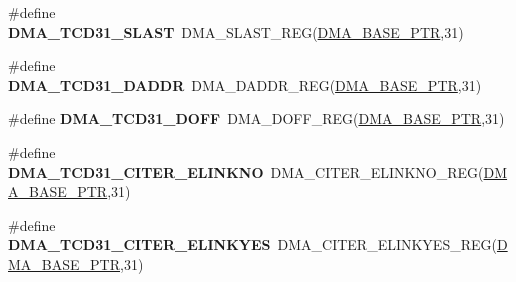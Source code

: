 \begin{DoxyCompactItemize}
\item 
\hypertarget{group___d_m_a___register___accessor___macros_gab9495f44e34200f346170d6ce6c875b5}{}\#define {\bfseries D\+M\+A\+\_\+\+T\+C\+D31\+\_\+\+S\+L\+A\+S\+T}~D\+M\+A\+\_\+\+S\+L\+A\+S\+T\+\_\+\+R\+E\+G(\hyperlink{group___d_m_a___peripheral_ga6997fbc1b1973e9f27170217a3bd6f22}{D\+M\+A\+\_\+\+B\+A\+S\+E\+\_\+\+P\+T\+R},31)\label{group___d_m_a___register___accessor___macros_gab9495f44e34200f346170d6ce6c875b5}

\item 
\hypertarget{group___d_m_a___register___accessor___macros_ga9c8a959955206d42530992dddc9a9bb7}{}\#define {\bfseries D\+M\+A\+\_\+\+T\+C\+D31\+\_\+\+D\+A\+D\+D\+R}~D\+M\+A\+\_\+\+D\+A\+D\+D\+R\+\_\+\+R\+E\+G(\hyperlink{group___d_m_a___peripheral_ga6997fbc1b1973e9f27170217a3bd6f22}{D\+M\+A\+\_\+\+B\+A\+S\+E\+\_\+\+P\+T\+R},31)\label{group___d_m_a___register___accessor___macros_ga9c8a959955206d42530992dddc9a9bb7}

\item 
\hypertarget{group___d_m_a___register___accessor___macros_ga5f305c712a4548ac254a6d0a9d2f3783}{}\#define {\bfseries D\+M\+A\+\_\+\+T\+C\+D31\+\_\+\+D\+O\+F\+F}~D\+M\+A\+\_\+\+D\+O\+F\+F\+\_\+\+R\+E\+G(\hyperlink{group___d_m_a___peripheral_ga6997fbc1b1973e9f27170217a3bd6f22}{D\+M\+A\+\_\+\+B\+A\+S\+E\+\_\+\+P\+T\+R},31)\label{group___d_m_a___register___accessor___macros_ga5f305c712a4548ac254a6d0a9d2f3783}

\item 
\hypertarget{group___d_m_a___register___accessor___macros_gaa0d42956a0bf2b1e720b16a35d726aed}{}\#define {\bfseries D\+M\+A\+\_\+\+T\+C\+D31\+\_\+\+C\+I\+T\+E\+R\+\_\+\+E\+L\+I\+N\+K\+N\+O}~D\+M\+A\+\_\+\+C\+I\+T\+E\+R\+\_\+\+E\+L\+I\+N\+K\+N\+O\+\_\+\+R\+E\+G(\hyperlink{group___d_m_a___peripheral_ga6997fbc1b1973e9f27170217a3bd6f22}{D\+M\+A\+\_\+\+B\+A\+S\+E\+\_\+\+P\+T\+R},31)\label{group___d_m_a___register___accessor___macros_gaa0d42956a0bf2b1e720b16a35d726aed}

\item 
\hypertarget{group___d_m_a___register___accessor___macros_ga5ffd83cb174518906df99d265b3cec0e}{}\#define {\bfseries D\+M\+A\+\_\+\+T\+C\+D31\+\_\+\+C\+I\+T\+E\+R\+\_\+\+E\+L\+I\+N\+K\+Y\+E\+S}~D\+M\+A\+\_\+\+C\+I\+T\+E\+R\+\_\+\+E\+L\+I\+N\+K\+Y\+E\+S\+\_\+\+R\+E\+G(\hyperlink{group___d_m_a___peripheral_ga6997fbc1b1973e9f27170217a3bd6f22}{D\+M\+A\+\_\+\+B\+A\+S\+E\+\_\+\+P\+T\+R},31)\label{group___d_m_a___register___accessor___macros_ga5ffd83cb174518906df99d265b3cec0e}


\end{DoxyCompactItemize}
